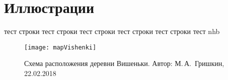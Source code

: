 ﻿\section{Иллюстрации}
тест строки тест строки тест строки тест строки тест строки тест nhb

\begin{figure}[h]
\texttt{[image: mapVishenki]}
\caption{Схема расположения деревни Вишеньки. Автор: М.\,А.~Гришкин, 22.02.2018}
\label{fig:mapVishenki}
\end{figure}

